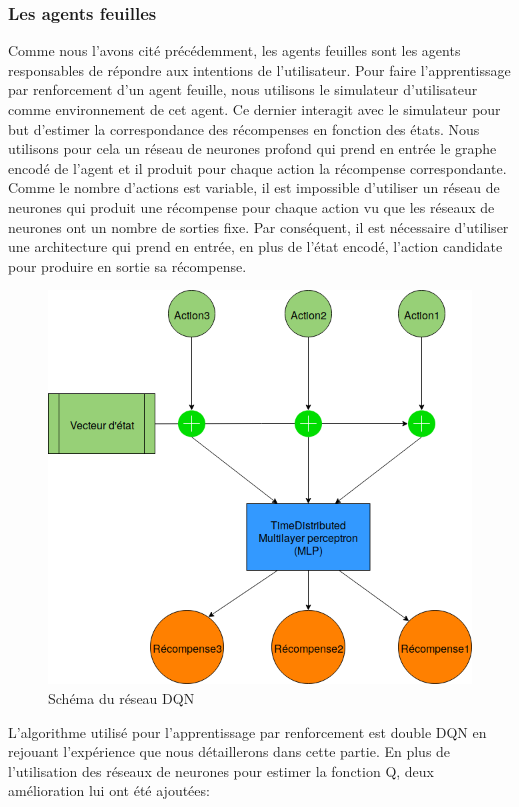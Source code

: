 \subsubsection{Les agents feuilles}
Comme nous l'avons cité précédemment, les agents feuilles sont les agents responsables de répondre aux intentions de l'utilisateur. Pour faire l'apprentissage par renforcement d'un agent feuille, nous utilisons le simulateur d'utilisateur comme environnement de cet agent. Ce dernier interagit avec le simulateur pour but d'estimer la correspondance des récompenses en fonction des états. Nous utilisons pour cela un réseau de neurones profond qui prend en entrée le graphe encodé de l'agent et il produit pour chaque action la récompense correspondante. Comme le nombre d'actions est variable, il est impossible d'utiliser un réseau de neurones qui produit une récompense pour chaque action vu que les réseaux de neurones ont un nombre de sorties fixe. Par conséquent, il est nécessaire d'utiliser une architecture qui prend en entrée, en plus de l'état encodé, l'action candidate pour produire en sortie sa récompense.\newpage
\begin{figure}[H]
	\centering
	\includegraphics[width=0.5\linewidth]{images/Conception/DM/time_dist.png}
	\caption{Schéma du réseau DQN}
\end{figure}\label{time_dist}
L'algorithme utilisé pour l'apprentissage par renforcement est double DQN en rejouant l'expérience que nous détaillerons dans cette partie. En plus de l'utilisation des réseaux de neurones pour estimer la fonction Q, deux amélioration lui ont été ajoutées:
